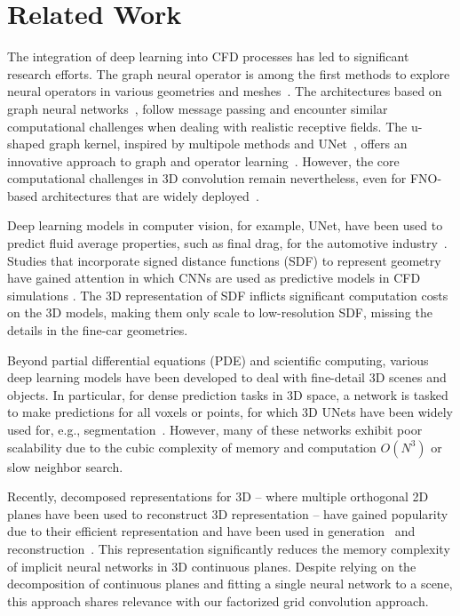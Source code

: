 \section{Related Work}
\label{sec:related-works}


The integration of deep learning into CFD processes has led to significant research efforts. The graph neural operator is among the first methods to explore neural operators in various geometries and meshes~\citep{li2020neural}. The architectures based on graph neural networks~\citep{ummenhofer2019lagrangian,sanchez2020learning,pfaff2020learning}, follow message passing and encounter similar computational challenges when dealing with realistic receptive fields. The u-shaped graph kernel, inspired by multipole methods and UNet~\citep{ronneberger2015u}, offers an innovative approach to graph and operator learning~\citep{li2020multipole}. However, the core computational challenges in 3D convolution remain nevertheless, even for FNO-based architectures that are widely deployed~\citep{li2022fourier,pathak2022fourcastnet,wen2023real}. 

Deep learning models in computer vision, for example, UNet, have been used to predict fluid average properties, such as final drag, for the automotive industry~\citep{jacob2021deep,trinh20243d}. Studies that incorporate signed distance functions (SDF) to represent geometry have gained attention in which CNNs are used as predictive models in CFD simulations \citep{guo2016convolutional,bhatnagar2019prediction}. The 3D representation of SDF inflicts significant computation costs on the 3D models, making them only scale to low-resolution SDF, missing the details in the fine-car geometries. 

Beyond partial differential equations (PDE) and scientific computing, various deep learning models have been developed to deal with fine-detail 3D scenes and objects.
In particular, for dense prediction tasks in 3D space, a network is tasked to make predictions for all voxels or points, for which 3D UNets have been widely used for, e.g., segmentation~\citep{li2018pointcnn,atzmon2018point,hermosilla2018mccnn,SubmanifoldSparseConvNet,choy20194d}. However, many of these networks exhibit poor scalability due to the cubic complexity of memory and computation $O(N^3)$ or slow neighbor search.

Recently, decomposed representations for 3D -- where multiple orthogonal 2D planes have been used to reconstruct 3D representation -- have gained popularity due to their efficient representation and have been used in generation~\citep{chan2022efficient,Shue_2023_CVPR} and reconstruction~\citep{Chen2022ECCV,kplanes_2023,cao2023hexplane}. This representation significantly reduces the memory complexity of implicit neural networks in 3D continuous planes. Despite relying on the decomposition of continuous planes and fitting a single neural network to a scene, this approach shares relevance with our factorized grid convolution approach.














